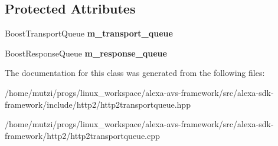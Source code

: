 \subsection*{Protected Attributes}
\begin{DoxyCompactItemize}
\item 
\mbox{\label{classhttp2_1_1HTTP2TransportQueue_a56e7b70b752125b72fc8123312609928}} 
Boost\+Transport\+Queue {\bfseries m\+\_\+transport\+\_\+queue}
\item 
\mbox{\label{classhttp2_1_1HTTP2TransportQueue_a35362e644edeee07ba7e1aedf5895dbb}} 
Boost\+Response\+Queue {\bfseries m\+\_\+response\+\_\+queue}
\end{DoxyCompactItemize}


The documentation for this class was generated from the following files\+:\begin{DoxyCompactItemize}
\item 
/home/mutzi/progs/linux\+\_\+workspace/alexa-\/avs-\/framework/src/alexa-\/sdk-\/framework/include/http2/http2transportqueue.\+hpp\item 
/home/mutzi/progs/linux\+\_\+workspace/alexa-\/avs-\/framework/src/alexa-\/sdk-\/framework/http2/http2transportqueue.\+cpp\end{DoxyCompactItemize}
